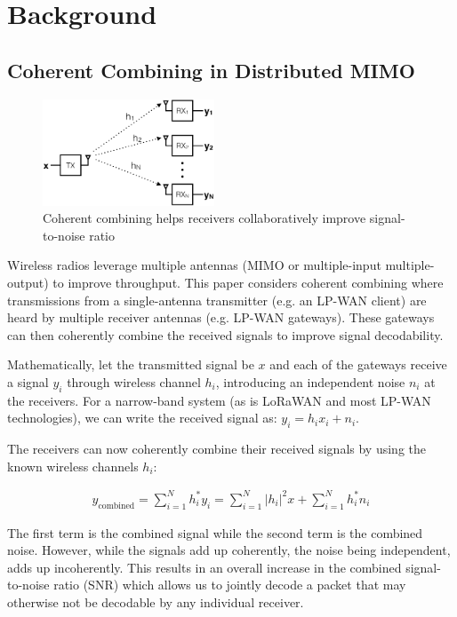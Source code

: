 \section{Background}
\label{sec:background}

\subsection{Coherent Combining in Distributed MIMO}
\label{sec:simo}

\begin{figure}[htb]
    \centering
    \includegraphics[height=1.25in]{figures/SIMO_cropped}
    \caption{Coherent combining helps receivers collaboratively improve
        signal-to-noise ratio}
    \label{fig:simo}
    \compactimg
\end{figure}

Wireless radios leverage multiple antennas (MIMO or multiple-input
multiple-output) to improve throughput. This paper considers coherent
combining where transmissions from a single-antenna transmitter (e.g. an
LP-WAN client) are heard by multiple receiver antennas (e.g. LP-WAN gateways).
These gateways can then coherently combine the received signals to improve
signal decodability.

Mathematically, let the transmitted signal be $x$ and each of the gateways
receive a signal $y_i$ through wireless channel $h_i$, introducing an
independent noise $n_i$ at the receivers. For a narrow-band system (as is
LoRaWAN and most LP-WAN technologies), we can write the received signal as:
$y_i = h_i x_i + n_i $.

The receivers can now coherently combine their received signals by using the
known wireless channels $h_i$:

\begin{align*}
y_{\text{combined}}
	= \sum_{i=1}^N h^*_i y_i
	= \sum_{i=1}^N \left| h_i \right|^2 x + \sum_{i=1}^N h^*_i n_i
\end{align*}

The first term is the combined signal while the second term is the combined
noise. However, while the signals add up coherently, the noise being
independent, adds up incoherently.  This results in an overall increase in the
combined signal-to-noise ratio (SNR) which allows us to jointly decode a
packet that may otherwise not be decodable by any individual receiver.

